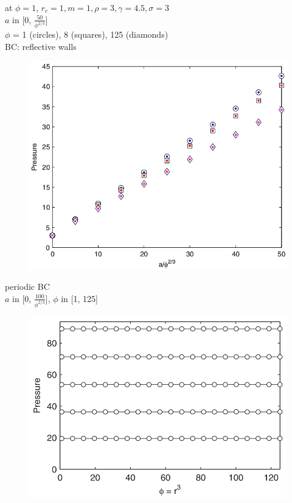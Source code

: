 \documentclass{beamer}
\begin{document}
\begin{frame}
at $\phi = 1$, $r_c =1, m=1, \rho=3, \gamma=4.5, \sigma=3$ \\
$a$ in [0, $\frac{50}{\phi^{2/3}}$] \\
$\phi$ = 1 (circles), 8 (squares), 125 (diamonds) \\
BC: reflective walls
\begin{figure}
\includegraphics[height=.7\textheight]{p.png}
\end{figure}
\end{frame}

\begin{frame}
periodic BC \\
$a$ in [0, $\frac{100}{\phi^{2/3}}$], $\phi$ in [1, 125]
\begin{figure}
\includegraphics[height=.7\textheight]{p2.png}
\end{figure}
\end{frame}
\end{document}
